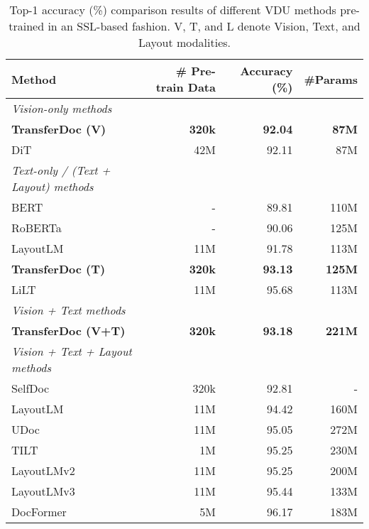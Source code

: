 \documentclass[preprint,review,12pt]{elsarticle}
\begin{document}
\begin{table}[t]
\centering
\begin{center}
\resizebox{\columnwidth}{!} {{\begin{tabular}{@{}lrrr@{}}
    \hline
        Method & \# Pre-train Data & Accuracy (\%) & \#Params\\
    \hline
    \textit{Vision-only methods}\\
    \hline
\textbf{TransferDoc (V)}   & \textbf{320k} & \textbf{92.04} & \textbf{87M}   \\
        DiT~\cite{li2022dit}                       & 42M & 92.11 & 87M    \\

    \hline
    \textit{Text-only / (Text + Layout) methods}\\
    \hline
        BERT~\cite{devlin2018bert}                 & - & 89.81 & 110M      \\
        RoBERTa~\cite{liu2019roberta}              & - & 90.06 & 125M      \\
        LayoutLM~\cite{xu2020layoutlm}             & 11M & 91.78 & 113M  \\
        \textbf{TransferDoc (T)}   & \textbf{320k} & \textbf{93.13} & \textbf{125M}   \\
        LiLT~\cite{wang2022lilt}                   & 11M & 95.68 & 113M  \\
    \hline
    \textit{Vision + Text methods}\\
    \hline
\textbf{TransferDoc (V+T)}   & \textbf{320k} & \textbf{93.18} & \textbf{221M}   \\
    \hline
    \textit{Vision + Text + Layout methods}\\
    \hline
        SelfDoc~\cite{li2021selfdoc}                        & 320k & 92.81 &  -         \\
        LayoutLM~\cite{xu2020layoutlm}             & 11M & 94.42 & 160M       \\
        UDoc~\cite{gu2022unified}                           & 11M & 95.05 & 272M       \\
        TILT~\cite{powalski2021going}              & 1M & 95.25 & 230M       \\
        LayoutLMv2~\cite{xu2020layoutlmv2}         & 11M & 95.25 & 200M       \\
        LayoutLMv3~\cite{huang2022layoutlmv3}      & 11M & 95.44 & 133M       \\
        DocFormer~\cite{appalaraju2021docformer}   & 5M & 96.17 & 183M       \\
    \hline
    \end{tabular}}}
\end{center}
\caption{Top-1 accuracy (\%) comparison results of different VDU methods pre-trained in an SSL-based fashion. V, T, and L denote Vision, Text, and Layout modalities.}
\label{tab:table_5.1}
\end{table}
\end{document}
